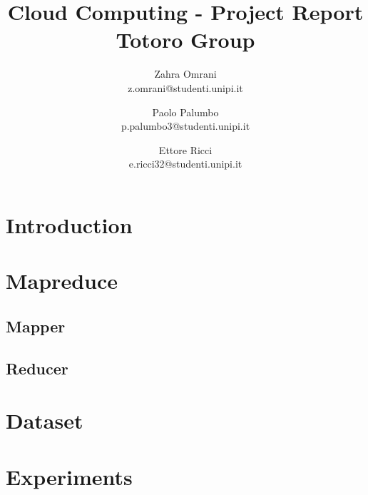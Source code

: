 \documentclass{article}
\title{Cloud Computing - Project Report \\ \small{Totoro Group}}
\author{
    Zahra Omrani \\ z.omrani@studenti.unipi.it \and 
    Paolo Palumbo \\ p.palumbo3@studenti.unipi.it \and
    Ettore Ricci \\ e.ricci32@studenti.unipi.it}
\begin{document}
\maketitle
\begin{abstract}
    
\end{abstract}
\begin{multicols}{2}
\section{Introduction}
\section{Mapreduce}
\subsection{Mapper}
\subsection{Reducer}
\section{Dataset}
\section{Experiments}

\end{multicols}
\end{document}
